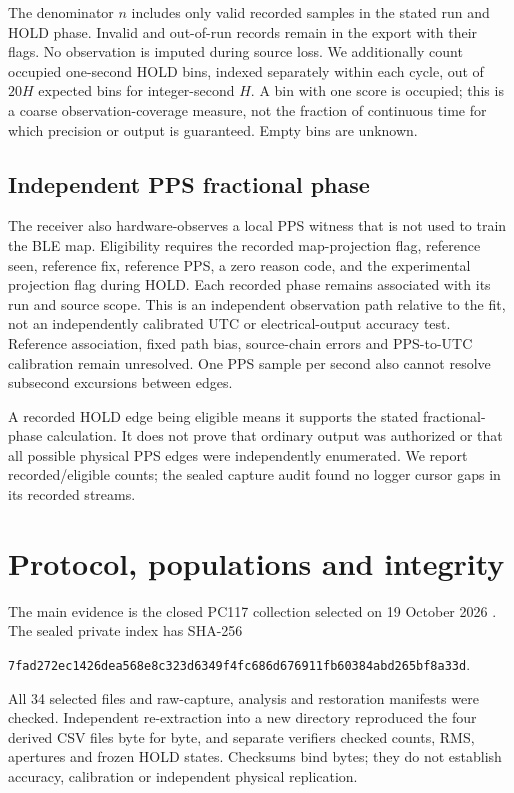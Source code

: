 \documentclass[11pt,letterpaper]{article}
\newcommand{\code}[1]{\texttt{#1}}
\begin{document}
The denominator $n$ includes only valid recorded samples in the stated run and HOLD phase. Invalid and out-of-run records remain in the export with their flags. No observation is imputed during source loss. We additionally count occupied one-second HOLD bins, indexed separately within each cycle, out of $20H$ expected bins for integer-second $H$. A bin with one score is occupied; this is a coarse observation-coverage measure, not the fraction of continuous time for which precision or output is guaranteed. Empty bins are unknown.

\subsection{Independent PPS fractional phase}
The receiver also hardware-observes a local PPS witness that is not used to train the BLE map. Eligibility requires the recorded map-projection flag, reference seen, reference fix, reference PPS, a zero reason code, and the experimental projection flag during HOLD. Each recorded phase remains associated with its run and source scope. This is an independent observation path relative to the fit, not an independently calibrated UTC or electrical-output accuracy test. Reference association, fixed path bias, source-chain errors and PPS-to-UTC calibration remain unresolved. One PPS sample per second also cannot resolve subsecond excursions between edges.

A recorded HOLD edge being eligible means it supports the stated fractional-phase calculation. It does not prove that ordinary output was authorized or that all possible physical PPS edges were independently enumerated. We report recorded/eligible counts; the sealed capture audit found no logger cursor gaps in its recorded streams.

\section{Protocol, populations and integrity}\label{sec:protocol}
The main evidence is the closed PC117 collection selected on 19 October 2026 \cite{supplement}. The sealed private index has SHA-256
\begin{center}\footnotesize\code{7fad272ec1426dea568e8c323d6349f4fc686d676911fb60384abd265bf8a33d}.\end{center}
All 34 selected files and raw-capture, analysis and restoration manifests were checked. Independent re-extraction into a new directory reproduced the four derived CSV files byte for byte, and separate verifiers checked counts, RMS, apertures and frozen HOLD states. Checksums bind bytes; they do not establish accuracy, calibration or independent physical replication.
\end{document}
